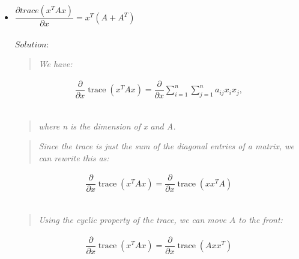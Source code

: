 \documentclass[a4paper]{article}
\begin{document}
\begin{itemize}
\begin{eqnarray*}
\begin{bmatrix}
                \end{bmatrix} = \sum_{i=1}^n\sum_{j=1}^n {a_{ij}}{x_i}{x_j}
        \end{eqnarray*}
        $Therefore,$ \\
        \begin{eqnarray*}
            \dfrac{\partial x^{T}Ax}{\partial {x_i}}=2x^{T}A = \sum_{j=1}^n ({a_{ij}} + {a_{ji}}){x_j}
            \dfrac{\partial x^{T}Ax}{\partial {x}} = {x^T}(A + {A^T}) = 2x^{T}A
        \end{eqnarray*}
        $Notice$ $that$ $A$ $is$ $symmetrice$\\
        \vspace*{2\baselineskip}
        \item $\dfrac{\partial trace( x^{T}Ax)}{\partial x}=x^{T}(A+A^{T})$\\
        \\
        $Solution:$ 
        \begin{quote}
            \emph{We have:}
        \end{quote}
        \begin{align*}
            \dfrac{\partial}{\partial x} \operatorname{trace}(x^{T}Ax) = \dfrac{\partial}{\partial x} \sum_{i=1}^{n} \sum_{j=1}^{n} a_{ij}x_{i}x_{j},
        \end{align*}\\
        \begin{quote}
            \emph{where n is the dimension of x and A.}
        \end{quote}
        
        \begin{quote}
            \emph{Since the trace is just the sum of the diagonal entries of a matrix, we can rewrite this as:}
        \end{quote}
        
        \begin{align*}
            \dfrac{\partial}{\partial x} \operatorname{trace}(x^{T}Ax) = \dfrac{\partial}{\partial x} \operatorname{trace}(xx^{T}A)
        \end{align*}\\
        
        \begin{quote}
            \emph{Using the cyclic property of the trace, we can move $A$ to the front:}
        \end{quote}
        
        \begin{align*}
            \dfrac{\partial}{\partial x} \operatorname{trace}(x^{T}Ax) = \dfrac{\partial}{\partial x} \operatorname{trace}(Axx^{T})
        \end{align*}\\
        

\end{itemize}
\end{document}
